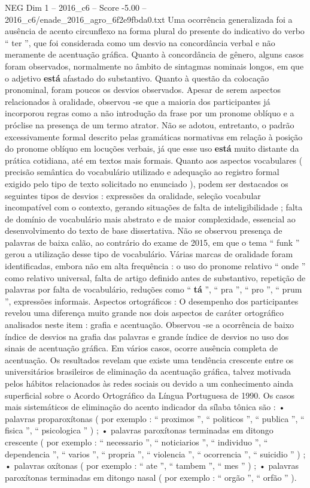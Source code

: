 \begin{textsample}{NEG Dim 1 – 2016\_c6 – Score -5.00 – 2016\_c6/enade\_2016\_agro\_6f2e9fbda0.txt}
Uma ocorrência generalizada foi a ausência de acento circunflexo na forma plural do presente do indicativo do verbo “ ter ”, que foi considerada como um desvio na concordância verbal e não meramente de acentuação gráfica.
Quanto à concordância de gênero, alguns casos foram observados, normalmente no âmbito de sintagmas nominais longos, em que o adjetivo \textbf{está} afastado do substantivo.
Quanto à questão da colocação pronominal, foram poucos os desvios observados.
Apesar de serem aspectos relacionados à oralidade, observou -se que a maioria dos participantes já incorporou regras como a não introdução da frase por um pronome oblíquo e a próclise na presença de um termo atrator.
Não se adotou, entretanto, o padrão excessivamente formal descrito pelas gramáticas normativas em relação à posição do pronome oblíquo em locuções verbais, já que esse uso \textbf{está} muito distante da prática cotidiana, até em textos mais formais.
Quanto aos aspectos vocabulares ( precisão semântica do vocabulário utilizado e adequação ao registro formal exigido pelo tipo de texto solicitado no enunciado ), podem ser destacados os seguintes tipos de desvios : expressões da oralidade, seleção vocabular incompatível com o contexto, gerando situações de falta de inteligibilidade ; falta de domínio de vocabulário mais abstrato e de maior complexidade, essencial ao desenvolvimento do texto de base dissertativa.
Não se observou presença de palavras de baixa calão, ao contrário do exame de 2015, em que o tema “ funk ” gerou a utilização desse tipo de vocabulário.
Várias marcas de oralidade foram identificadas, embora não em alta frequência : o uso do pronome relativo “ onde ” como relativo universal, falta de artigo definido antes de substantivo, repetição de palavras por falta de vocabulário, reduções como “ \textbf{tá} ”, “ pra ”, “ pro ”, “ prum ”, expressões informais.
Aspectos ortográficos : O desempenho dos participantes revelou uma diferença muito grande nos dois aspectos de caráter ortográfico analisados neste item : grafia e acentuação.
Observou -se a ocorrência de baixo índice de desvios na grafia das palavras e grande índice de desvios no uso dos sinais de acentuação gráfica.
Em vários casos, ocorre ausência completa de acentuação.
Os resultados revelam que existe uma tendência crescente entre os universitários brasileiros de eliminação da acentuação gráfica, talvez motivada pelos hábitos relacionados às redes sociais ou devido a um conhecimento ainda superficial sobre o Acordo Ortográfico da Língua Portuguesa de 1990.
Os casos mais sistemáticos de eliminação do acento indicador da sílaba tônica são : • palavras proparoxítonas ( por exemplo : “ proximos ”, “ politicos ”, “ publica ”, “ fisica ”, “ psicologica ” ) ; • palavras paroxítonas terminadas em ditongo crescente ( por exemplo : “ necessario ”, “ noticiarios ”, “ individuo ”, “ dependencia ”, “ varios ”, “ propria ”, “ violencia ”, “ ocorrencia ”, “ suicidio ” ) ; • palavras oxítonas ( por exemplo : “ ate ”, “ tambem ”, “ mes ” ) ; • palavras paroxítonas terminadas em ditongo nasal ( por exemplo : “ orgão ”, “ orfão ” ).

\end{textsample}
